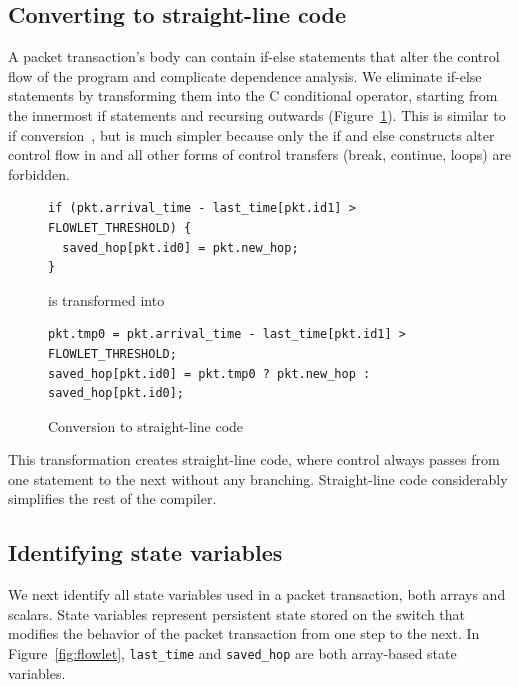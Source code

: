 \subsection{Converting to straight-line code}
A packet transaction's body can contain if-else statements that alter the
control flow of the program and complicate dependence analysis. We eliminate
if-else statements by transforming them into the C conditional operator,
starting from the innermost if statements and recursing outwards
(Figure~\ref{fig:if_convert}). This is similar to if
conversion~\cite{allen_if_conversion}, but is much simpler because only the if
and else constructs alter control flow in \pktlanguage and all other forms of
control transfers (break, continue, loops) are forbidden.
\begin{figure}
\begin{tiny}
\begin{lstlisting}
if (pkt.arrival_time - last_time[pkt.id1] > FLOWLET_THRESHOLD) {
  saved_hop[pkt.id0] = pkt.new_hop;
}
\end{lstlisting}
\end{tiny}
\begin{center}
is transformed into
\end{center}
\begin{tiny}
\begin{lstlisting}
pkt.tmp0 = pkt.arrival_time - last_time[pkt.id1] > FLOWLET_THRESHOLD;
saved_hop[pkt.id0] = pkt.tmp0 ? pkt.new_hop : saved_hop[pkt.id0];
\end{lstlisting}
\end{tiny}
\caption{Conversion to straight-line code}
\label{fig:if_convert}
\end{figure}

This transformation creates straight-line code, where control always passes
from one statement to the next without any branching. Straight-line code
considerably simplifies the rest of the compiler.

\subsection{Identifying state variables}

We next identify all state variables used in a packet transaction, both arrays
and scalars. State variables represent persistent state stored on the switch
that modifies the behavior of the packet transaction from one step to the next.
In Figure~\ref{fig:flowlet}, \texttt{last\_time} and \texttt{saved\_hop} are
both array-based state variables.

